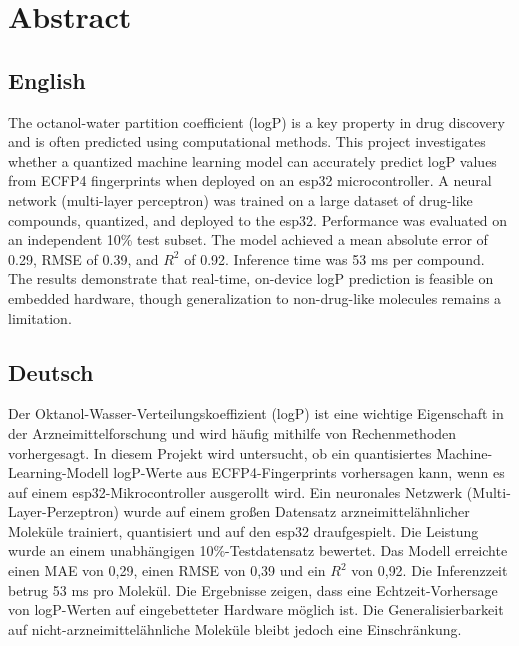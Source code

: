 \chapter*{Abstract}


\section*{English}

The octanol-water partition coefficient (logP) is a key property in drug discovery and is often predicted using computational methods.
This project investigates whether a quantized machine learning model can accurately predict logP values from ECFP4 fingerprints when deployed on an \gls{esp32} microcontroller.
A neural network (multi-layer perceptron) was trained on a large dataset of drug-like compounds, quantized, and deployed to the \gls{esp32}. Performance was evaluated on an independent 10\% test subset.
The model achieved a mean absolute error of 0.29, RMSE of 0.39, and $R^2$ of 0.92. Inference time was 53 ms per compound.
The results demonstrate that real-time, on-device logP prediction is feasible on embedded hardware, though generalization to non-drug-like molecules remains a limitation.


\section*{Deutsch}

Der Oktanol-Wasser-Verteilungskoeffizient (logP) ist eine wichtige Eigenschaft in der Arzneimittelforschung und wird häufig mithilfe von Rechenmethoden vorhergesagt.
In diesem Projekt wird untersucht, ob ein quantisiertes Machine-Learning-Modell logP-Werte aus ECFP4-Fingerprints vorhersagen kann, wenn es auf einem \gls{esp32}-Mikrocontroller ausgerollt wird.
Ein neuronales Netzwerk (Multi-Layer-Perzeptron) wurde auf einem großen Datensatz arzneimittelähnlicher Moleküle trainiert, quantisiert und auf den \gls{esp32} draufgespielt. Die Leistung wurde an einem unabhängigen 10\%-Testdatensatz bewertet.
Das Modell erreichte einen MAE von 0{,}29, einen RMSE von 0{,}39 und ein $R^2$ von 0{,}92. Die Inferenzzeit betrug 53 ms pro Molekül.
Die Ergebnisse zeigen, dass eine Echtzeit-Vorhersage von logP-Werten auf eingebetteter Hardware möglich ist. Die Generalisierbarkeit auf nicht-arzneimittelähnliche Moleküle bleibt jedoch eine Einschränkung.
